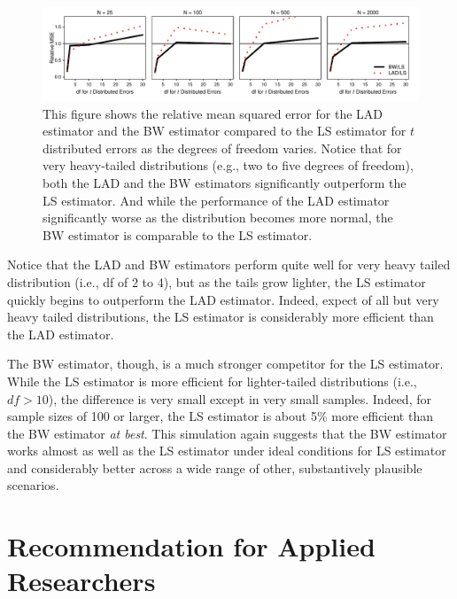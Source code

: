\documentclass[12pt]{article}
\begin{document}
\begin{figure}[h!]
\begin{center}
\includegraphics[width = \textwidth]{figs/mc-sims.pdf}
\caption{This figure shows the relative mean squared error for the LAD estimator and the BW estimator compared to the LS estimator for $t$ distributed errors as the degrees of freedom varies. Notice that for very heavy-tailed distributions (e.g., two to five degrees of freedom), both the LAD and the BW estimators significantly outperform the LS estimator. And while the performance of the LAD estimator significantly worse as the distribution becomes more normal, the BW estimator is comparable to the LS estimator.}\label{fig:mc-sims}
\end{center}
\end{figure}

Notice that the LAD and BW estimators perform quite well for very heavy tailed distribution (i.e., df of 2 to 4), but as the tails grow lighter, the LS estimator quickly begins to outperform the LAD estimator. Indeed, expect of all but very heavy tailed distributions, the LS estimator is considerably more efficient than the LAD estimator. 

The BW estimator, though, is a much stronger competitor for the LS estimator. While the LS estimator is more efficient for lighter-tailed distributions (i.e., $df > 10$), the difference is very small except in very small samples. Indeed, for sample sizes of 100 or larger, the LS estimator is about 5\% more efficient than the BW estimator \textit{at best}. This simulation again suggests that the BW estimator works almost as well as the LS estimator under ideal conditions for LS estimator and considerably better across a wide range of other, substantively plausible scenarios.

\section*{Recommendation for Applied Researchers}
\end{document}
